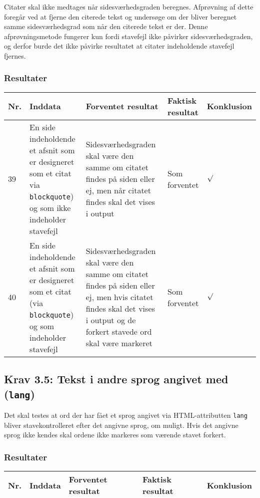 \documentclass[a4paper,oneside,article]{memoir}
\begin{document}
\begin{landscape}
Citater skal ikke medtages når sidesværhedsgraden beregnes. Afprøvning
af dette foregår ved at fjerne den citerede tekst og undersøge om der
bliver beregnet samme sidesværhedsgrad som når den citerede tekst er
der. Denne afprøvningsmetode fungerer kun fordi stavefejl ikke
påvirker sidesværhedsgraden, og derfor burde det ikke påvirke
resultatet at citater indeholdende stavefejl fjernes.

\subsubsection{Resultater}
\begin{longtable}[c]{p{20pt}|p{220pt}|p{130pt}|p{130pt}|p{50pt}}
\textbf{Nr.} &
\textbf{Inddata} &
\textbf{Forventet resultat} &
\textbf{Faktisk resultat} &
\textbf{Konklusion} \\ \hline

39 &
En side indeholdende et afsnit som er designeret som et citat
via \texttt{blockquote}) og som ikke indeholder stavefejl &
Sidesværhedsgraden skal være den samme om citatet findes på siden
eller ej, men når citatet findes skal det vises i output &
Som forventet &
$\surd$ \\ \hline

40 &
En side indeholdende et afsnit som er designeret som et citat (via
\texttt{blockquote}) og som indeholder stavefejl &
Sidesværhedsgraden skal være den samme om citatet findes på siden
eller ej, men hvis citatet findes skal det vises i output og de
forkert stavede ord skal være markeret &
Som forventet &
$\surd$ \\ \hline

\end{longtable}

\subsection{Krav 3.5: Tekst i andre sprog angivet med
  (\texttt{lang})}

Det skal testes at ord der har fået et sprog angivet via
HTML-attributten \texttt{lang} bliver stavekontrolleret efter det
angivne sprog, om muligt. Hvis det angivne sprog ikke kendes skal
ordene ikke markeres som værende stavet forkert.

\subsubsection{Resultater}
\begin{longtable}[c]{p{20pt}|p{220pt}|p{130pt}|p{130pt}|p{50pt}}
\textbf{Nr.} &
\textbf{Inddata} &
\textbf{Forventet resultat} &
\textbf{Faktisk resultat} &
\textbf{Konklusion} \\ \hline


\end{longtable}
\end{landscape}
\end{document}
